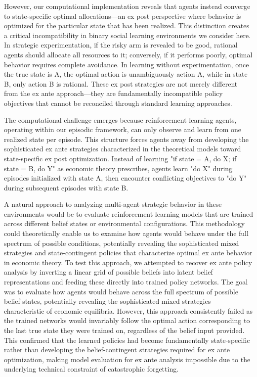 However, our computational implementation reveals that agents instead converge to state-specific optimal allocations—an ex post perspective where behavior is optimized for the particular state that has been realized. This distinction creates a critical incompatibility in binary social learning environments we consider here. In strategic experimentation, if the risky arm is revealed to be good, rational agents should allocate all resources to it; conversely, if it performs poorly, optimal behavior requires complete avoidance. In learning without experimentation, once the true state is A, the optimal action is unambiguously action A, while in state B, only action B is rational. These ex post strategies are not merely different from the ex ante approach—they are fundamentally incompatible policy objectives that cannot be reconciled through standard learning approaches.

The computational challenge emerges because reinforcement learning agents, operating within our episodic framework, can only observe and learn from one realized state per episode. This structure forces agents away from developing the sophisticated ex ante strategies characterized in the theoretical models toward state-specific ex post optimization. Instead of learning "if state = A, do X; if state = B, do Y" as economic theory prescribes, agents learn "do X" during episodes initialized with state A, then encounter conflicting objectives to "do Y" during subsequent episodes with state B.

A natural approach to analyzing multi-agent strategic behavior in these environments would be to evaluate reinforcement learning models that are trained across different belief states or environmental configurations. This methodology could theoretically enable us to examine how agents would behave under the full spectrum of possible conditions, potentially revealing the sophisticated mixed strategies and state-contingent policies that characterize optimal ex ante behavior in economic theory. To test this approach, we attempted to recover ex ante policy analysis by inverting a linear grid of possible beliefs into latent belief representations and feeding these directly into trained policy networks. The goal was to evaluate how agents would behave across the full spectrum of possible belief states, potentially revealing the sophisticated mixed strategies characteristic of economic equilibria. However, this approach consistently failed as the trained networks would invariably follow the optimal action corresponding to the last true state they were trained on, regardless of the belief input provided. This confirmed that the learned policies had become fundamentally state-specific rather than developing the belief-contingent strategies required for ex ante optimization, making model evaluation for ex ante analysis impossible due to the underlying technical constraint of catastrophic forgetting.

